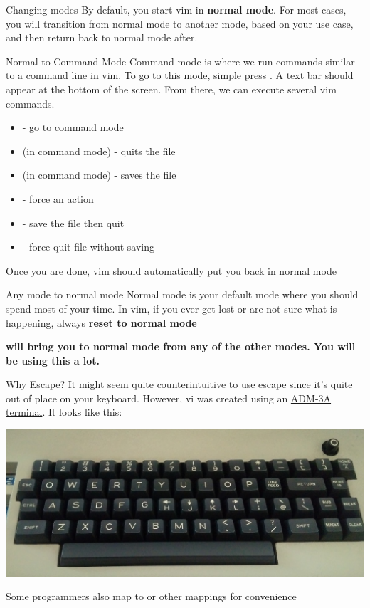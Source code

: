 \documentclass[12pt]{beamer}
\begin{document}
\begin{frame}{Changing modes}
    By default, you start vim in \textbf{normal mode}. For most cases, you will transition from normal mode to 
    another mode, based on your use case, and then return back to normal mode after.
\end{frame}{}

\begin{frame}{Normal to Command Mode}
    Command mode is where we run commands similar to a command line in vim.
    To go to this mode, simple press \keys{:}. A text bar should appear at the bottom of the screen. From there,
    we can execute several vim commands.
    \begin{itemize}
        \item \keys{:} - go to command mode
        \item {} (in command mode) - quits the file
        \item {} (in command mode) - saves the file
        \item \keys{!} - force an action
        \item {} - save the file then quit
        \item {} - force quit file without saving
    \end{itemize}{}
    Once you are done, vim should automatically put you back in normal mode
\end{frame}{}

\begin{frame}{Any mode to normal mode}
    Normal mode is your default mode where you should spend most of your time. In vim, if you ever get lost
    or are not sure what is happening, always \textbf{reset to normal mode}
    
    \textbf{
     will bring you to normal mode from any of the other modes. You will be using this a lot.
    }
\end{frame}{}

\begin{frame}{Why Escape?}
    It might seem quite counterintuitive to use escape since it's quite out of place on your keyboard. However, 
    vi was created using an \underline{ADM-3A terminal}. It looks like this:
    \begin{center}
        \includegraphics[width=0.75\linewidth]{2022hs5/adm-3a.png}
    \end{center}{}
    Some programmers also map  to  or other mappings for convenience
\end{frame}
\end{document}
